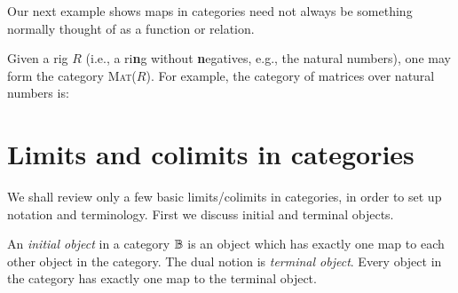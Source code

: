 Our next example shows maps in categories need not always be something normally thought of as a
function or relation.

\begin{example}\label{ex:matrix_category}
Given a rig $R$ (i.e., a ri\textbf{n}g without \textbf{n}egatives, e.g., the natural numbers), one may
form the category \textsc{Mat}($R$). For example, the category of matrices over natural numbers is:
\end{example}






\section{Limits and colimits in categories} %
\label{sub:limits_and_colimits_in_categories}

We shall review only a few basic limits/colimits in categories, in order to set up notation and
terminology. First we discuss initial and terminal objects.

\begin{definition}\label{def:initial_object}
  An \emph{initial object} in a category $\mathbb{B}$ is an object which has exactly one map to each other
  object in the category. The dual notion is \emph{terminal object}. Every object in the category
  has exactly one map to the terminal object.
\end{definition}


